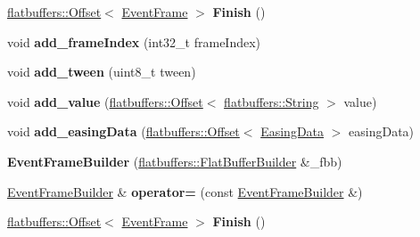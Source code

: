 \begin{DoxyCompactItemize}
\hyperlink{structflatbuffers_1_1Offset}{flatbuffers\+::\+Offset}$<$ \hyperlink{structflatbuffers_1_1EventFrame}{Event\+Frame} $>$ {\bfseries Finish} ()
\item 
\mbox{\label{structflatbuffers_1_1EventFrameBuilder_ac5ae2f1f2a7a9b3da8f575480efb65f5}} 
void {\bfseries add\+\_\+frame\+Index} (int32\+\_\+t frame\+Index)
\item 
\mbox{\label{structflatbuffers_1_1EventFrameBuilder_a42b6e9e1508b5673278b8cbb19b084b3}} 
void {\bfseries add\+\_\+tween} (uint8\+\_\+t tween)
\item 
\mbox{\label{structflatbuffers_1_1EventFrameBuilder_adc12ab24bd514c0d5066cd4738681499}} 
void {\bfseries add\+\_\+value} (\hyperlink{structflatbuffers_1_1Offset}{flatbuffers\+::\+Offset}$<$ \hyperlink{structflatbuffers_1_1String}{flatbuffers\+::\+String} $>$ value)
\item 
\mbox{\label{structflatbuffers_1_1EventFrameBuilder_a1ddb5416873dce9450fc7b961f1e962b}} 
void {\bfseries add\+\_\+easing\+Data} (\hyperlink{structflatbuffers_1_1Offset}{flatbuffers\+::\+Offset}$<$ \hyperlink{structflatbuffers_1_1EasingData}{Easing\+Data} $>$ easing\+Data)
\item 
\mbox{\label{structflatbuffers_1_1EventFrameBuilder_a357d0f3714a7d7411d4c6c63f5615b15}} 
{\bfseries Event\+Frame\+Builder} (\hyperlink{classflatbuffers_1_1FlatBufferBuilder}{flatbuffers\+::\+Flat\+Buffer\+Builder} \&\+\_\+fbb)
\item 
\mbox{\label{structflatbuffers_1_1EventFrameBuilder_a8306ba7dcce0efe1dd90ee31ad4ea4d1}} 
\hyperlink{structflatbuffers_1_1EventFrameBuilder}{Event\+Frame\+Builder} \& {\bfseries operator=} (const \hyperlink{structflatbuffers_1_1EventFrameBuilder}{Event\+Frame\+Builder} \&)
\item 
\mbox{\label{structflatbuffers_1_1EventFrameBuilder_a07e7912370e13e260485af14f6e441fa}} 
\hyperlink{structflatbuffers_1_1Offset}{flatbuffers\+::\+Offset}$<$ \hyperlink{structflatbuffers_1_1EventFrame}{Event\+Frame} $>$ {\bfseries Finish} ()
\end{DoxyCompactItemize}
